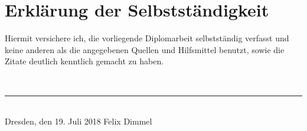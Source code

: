 
\chapter*{Erklärung der Selbstständigkeit}
\thispagestyle{empty}
Hiermit versichere ich, die vorliegende Diplomarbeit selbstständig verfasst und keine
anderen als die angegebenen Quellen und Hilfsmittel benutzt, sowie die Zitate
deutlich kenntlich gemacht zu haben.

\mbox{}\vspace{2\baselineskip}\\

\hfill\noindent\rule{5cm}{0.2pt}\\
Dresden, den 19. Juli 2018 \hfill Felix Dimmel

\clearpage\mbox{}\thispagestyle{empty}

